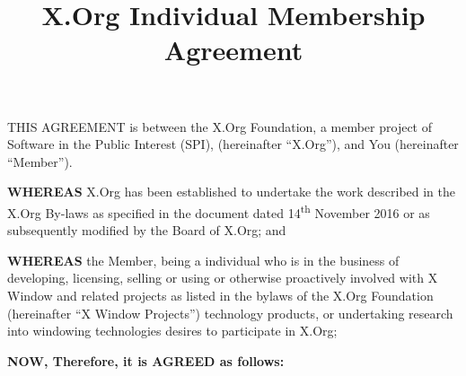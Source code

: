 \documentclass[10pt, english]{xorgdocs}
\newcommand\nth{\textsuperscript{th}\xspace} %
\begin{document}
\title{X.Org Individual Membership Agreement}
\immediate{}
\date{}
\maketitle

THIS AGREEMENT is between the X.Org Foundation, a member project of Software
in the Public Interest (SPI), (hereinafter ``X.Org''), and You (hereinafter
``Member'').

\textbf{WHEREAS} X.Org has been established to undertake the work described
in the X.Org By-laws as specified in the document dated 14\nth November 2016
or as subsequently modified by the Board of X.Org; and

\textbf{WHEREAS} the Member, being a individual who is in the business of
developing, licensing, selling or using or otherwise proactively involved
with X Window and related projects as listed in the bylaws of the X.Org
Foundation (hereinafter ``X Window Projects'') technology products, or
undertaking research into windowing technologies desires to participate
in X.Org;

\textbf{NOW, Therefore, it is AGREED as follows:}
\end{document}
